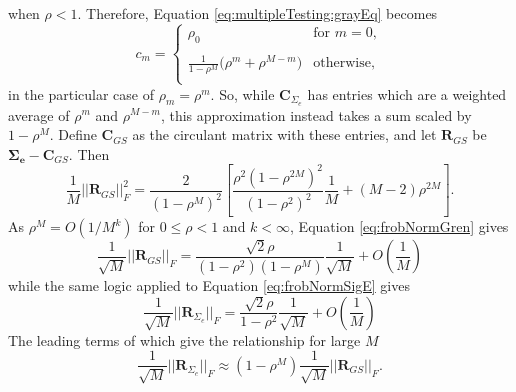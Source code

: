 \documentclass[letterpaper,12pt,oneside,final]{article}
\newcommand{\m}[1]{\mathbf{#1}}               %
\newcommand{\sm}[1]{\boldsymbol{#1}}   %
\newcommand{\norm}[1]{||{#1}||}              %
\newcommand{\frob}[1]{\norm{#1}_F}
\begin{document}
when $\rho < 1$. Therefore, Equation \ref{eq:multipleTesting:grayEq} becomes
\begin{equation} \label{eq:multipleTesting:grayApprox}
  c_m = \begin{cases}
    \rho_0 & \text{for } m = 0, \\
    & \\
    \frac{1}{1 - \rho^M} \big ( \rho^m + \rho^{M-m} \big )  & \text{otherwise},\\
  \end{cases}
\end{equation}
in the particular case of $\rho_m = \rho^m$. So, while $\m{C}_{\Sigma_e}$ has entries which are a weighted average of $\rho^m$ and $\rho^{M-m}$, this approximation instead takes a sum scaled by $1 - \rho^M$. Define $\m{C}_{GS}$ as the circulant matrix with these entries, and let $\m{R}_{GS}$ be $\sm{\Sigma_e} - \m{C}_{GS}$. Then
\begin{equation} \label{eq:frobNormGren}
    \frac{1}{M} \frob{\m{R}_{GS}}^2 = \frac{2}{(1 - \rho^M)^2} \left [ \frac{\rho^2 (1 - \rho^{2M})^2}{(1 - \rho^2)^2} \frac{1}{M} + (M - 2) \rho^{2M} \right ].
\end{equation}
As $\rho^M = O(1/M^k)$ for $0 \leq \rho < 1$ and $k < \infty$, Equation \ref{eq:frobNormGren} gives
\begin{equation} \label{eq:GrenLeading}
  \frac{1}{\sqrt{M}} \frob{\m{R}_{GS}} = \frac{\sqrt{2} \rho}{(1 - \rho^2) (1 - \rho^M)} \frac{1}{\sqrt{M}} + O\left(\frac{1}{M}\right)
\end{equation}
while the same logic applied to Equation \ref{eq:frobNormSigE} gives
\begin{equation} \label{eq:nearLeading}
  \frac{1}{\sqrt{M}} \frob{\m{R}_{\Sigma_e}} = \frac{\sqrt{2} \rho}{1 - \rho^2} \frac{1}{\sqrt{M}} + O\left(\frac{1}{M}\right)
\end{equation}
The leading terms of which give the relationship for large $M$
\begin{equation*}
 \frac{1}{\sqrt{M}}\frob{\m{R}_{\Sigma_e}} \approx (1 - \rho^M) \frac{1}{\sqrt{M}} \frob{\m{R}_{GS}}.
\end{equation*}
\end{document}
